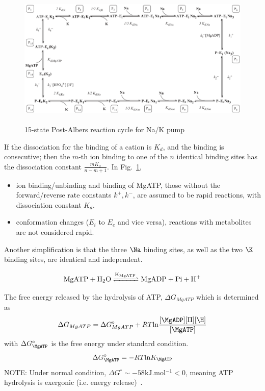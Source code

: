 \begin{figure}[hbt]
  \centerline{\includegraphics[height=6.6cm,
    angle=0]{./images/Post-Albers_NaK.eps}}
\caption{15-state Post-Albers reaction cycle for Na/K pump}
\label{fig:Post-Albers_NaK}
\end{figure}

If the dissociation for the binding of a cation is $K_d$, and the
binding is consecutive; then the $m$-th ion binding to one of the $n$
identical binding sites has the dissociation constant
$\frac{mK_d}{n-m+1}$. In Fig.~\ref{fig:Post-Albers_NaK}, 
\begin{itemize}
\item ion binding/unbinding and binding of MgATP, those without the
  forward/reverse rate constants $k^+, k^-$, are assumed to be rapid
  reactions, with dissociation constant $K_d$.

\item conformation changes ($E_i$ to $E_e$ and vice versa), reactions
  with metabolites are not considered rapid. 
\end{itemize}

Another simplification is that the three $\Na$ binding sites, as well
as the two $\K$ binding sites, are identical and independent.

\begin{equation}
  \label{eq:1177}
  \ce{MgATP + H2O <=>[K_{MgATP}] MgADP + Pi + H+}
\end{equation}

The free energy released by the hydrolysis of ATP, $\Delta G_{MgATP}$
which is determined as
\begin{equation}
  \label{eq:1178}
  \Delta G_{MgATP} = \Delta G^\circ_{MgATP} + RT\ln\frac{[\MgADP][\Pi][\H]}{[\MgATP]}
\end{equation}
with $\Delta G^\circ_\MgATP$ is the free energy under standard
condition. 
\begin{equation}
  \label{eq:1179}
  \Delta G^\circ_\MgATP = -RT \ln K_\MgATP
\end{equation}
NOTE: Under normal condition, $\Delta G^\circ \sim -58$kJ.mol$^{-1} < 0$,
meaning ATP hydrolysis is exergonic (i.e. energy release)~\citep{ingwall2002}. 

